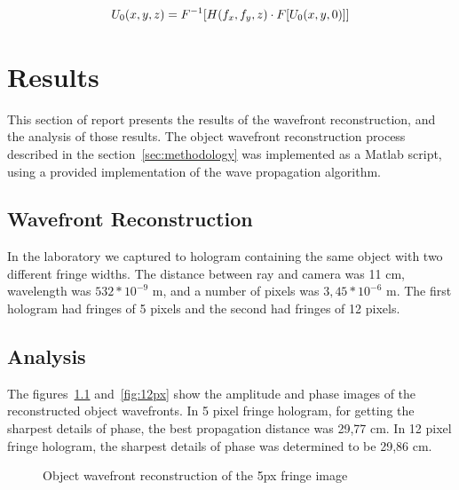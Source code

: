 \documentclass[12pt,a4paper,english
]{tunithesis}
\begin{document}
\begin{align}
U_0(x,y,z) &= F^{-1}[H(f_x,f_y,z) \cdot F[U_0(x,y,0)]] \notag \\
\label{eq:projection}
\end{align}


\chapter{Results}
\label{sec:results}
This section of report presents the results of the wavefront reconstruction, and the analysis of those results.
The object wavefront reconstruction process described in the section~\ref{sec:methodology} was implemented as a Matlab script, using a provided implementation of the wave propagation algorithm. 

\section{Wavefront Reconstruction}
In the laboratory we captured to hologram containing the same object with two different fringe widths. The distance between ray and camera was 11 cm, wavelength was ${532 * 10^{-9}}$ m, and a number of pixels was ${3,45*10^{-6}}$ m. The first hologram had fringes of 5 pixels and the second had fringes of 12 pixels.

\section{Analysis}
The figures~\ref{fig:5px} and~\ref{fig:12px} show the amplitude and phase images of the reconstructed object wavefronts. In 5 pixel fringe hologram, for getting the sharpest details of phase, the best propagation distance was 29,77 cm. In 12 pixel fringe hologram, the sharpest details of phase was determined to be 29,86 cm.


\begin{figure}
  \centering
  \caption{Object wavefront reconstruction of the 5px fringe image}
   \label{fig:5px}
\end{figure}
\end{document}
